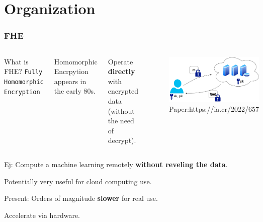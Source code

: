 \documentclass[10pt,handout]{beamer}
\title[]{}
\author[Matias Mazzanti]{Matias Mazzanti}
\begin{document}
\section{Organization}

\begin{frame}
\frametitle{FHE}
\begin{columns}
        What is FHE? \texttt{Fully Homomorphic Encryption}
\vspace{0.3cm}

Homomorphic Encrpytion appears in the early 80s.
\vspace{0.3cm}

Operate \textbf{directly} with encrypted data (without the need of decrypt).


\begin{figure}[h!]
    \centering
    \includegraphics[scale=0.1]{fhe.jpg}
    \caption{Paper:https://ia.cr/2022/657}
\end{figure}
\end{columns}


 \vspace{-0.25cm}
\pause
Ej: Compute a machine learning remotely \textbf{without reveling the data}.
 \vspace{-0.1cm}


Potentially very useful for cloud computing use.
 \vspace{-0.1cm}

 \pause
Present: Orders of magnitude \textbf{slower} for real use.
 \vspace{-0.1cm}

\pause
\begin{mdframed}[backgroundcolor=frenchblue!20]\centering
  Accelerate via hardware.
\end{mdframed}


\end{frame}
\end{document}
